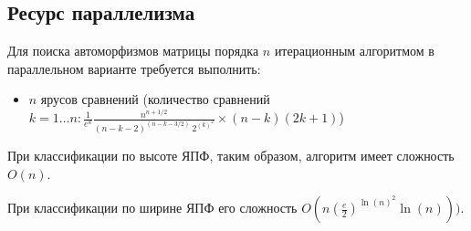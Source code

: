 \subsection{Ресурс параллелизма}
Для поиска автоморфизмов матрицы порядка $n$ итерационным алгоритмом в параллельном варианте требуется выполнить:

\begin{itemize}
\item $n$ ярусов сравнений (количество сравнений $ k = 1 \ldots n: \frac{1}{e^{k}} \frac{n^{n+1/2}}{(n-k-2)^{(n-k-3/2)}~2^{(k)^2}} \times (n - k)(2k + 1) $)
\end{itemize}

При классификации по высоте ЯПФ, таким образом, алгоритм имеет сложность $ O(n) $.

При классификации по ширине ЯПФ его сложность $ O(n(\frac{e}{2})^{\ln(n)^2} \ln(n))) $.
